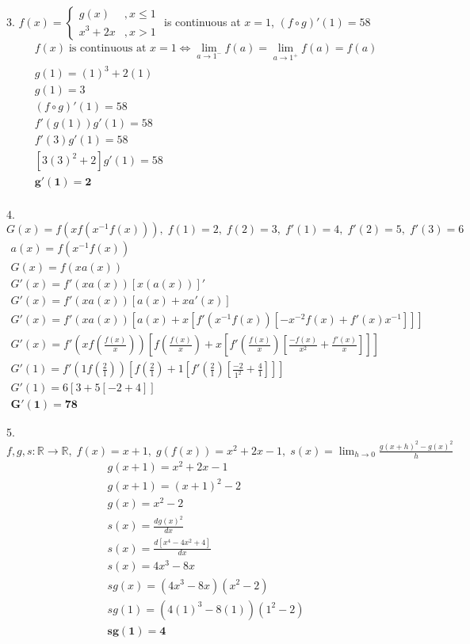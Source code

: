 \documentclass[12pt, letterpaper]{article}
\begin{document}
\newpage

3. \quad $ f(x) = \begin{cases}
    g(x) &,x \leq 1 \\
    x^3 + 2x &,x > 1
\end{cases}$ \; is continuous at $x=1$, $ (f \circ g)'(1) = 58 $
\begin{gather*}
    f(x) \; \text{is continuous at $x = 1$} \iff \lim_{a \to 1^-}f(a) = \lim_{a \to 1^+}f(a) = f(a)  \\
    g(1) = (1)^3 + 2(1) \\
    g(1) = 3 \\[8mm]
    (f \circ g)'(1) = 58 \\
    f'(g(1))g'(1) = 58 \\
    f'(3)g'(1) = 58 \\
    [3(3)^2 + 2]g'(1) = 58 \\
    \bm{g'(1) = 2} \\
\end{gather*}

4. \quad $ G(x) = f(xf(x^{-1}f(x))), \; f(1) = 2, \; f(2) = 3, \; f'(1) = 4, \; f'(2) = 5, \; f'(3) = 6$
\begin{gather*}
    a(x) = f(x^{-1}f(x)) \\
    G(x) = f(xa(x)) \\[8mm]
    G'(x) = f'(xa(x))[x(a(x))]' \\
    G'(x) = f'(xa(x))[a(x) + xa'(x)] \\
    G'(x) = f'(xa(x))[a(x) + x[f'(x^{-1}f(x))[-x^{-2}f(x) + f'(x)x^{-1}]]] \\
    G'(x) = f'(xf(\frac{f(x)}{x}))\left[ f(\frac{f(x)}{x}) +
    x\left[ f'(\frac{f(x)}{x})\left[ \frac{-f(x)}{x^2} + \frac{f'(x)}{x}\right] \right] \right] \\[8mm]
    G'(1) = f'(1f(\frac{2}{1}))\left[ f(\frac{2}{1}) +
    1\left[ f'(\frac{2}{1})\left[ \frac{-2}{1^2} + \frac{4}{1}\right] \right] \right] \\
    G'(1) = 6[3 + 5[-2 + 4]] \\
    \bm{G'(1) = 78}
\end{gather*}

5. \quad $ f, g, s : \mathbb{R} \to \mathbb{R}, \; f(x) = x + 1, \; g(f(x)) = x^2 + 2x - 1, \;
s(x) = \lim_{h\to0}\frac{g(x+h)^2 - g(x)^2}{h} $
\begin{gather*}
    g(x+1) = x^2 + 2x - 1 \\
    g(x+1) = (x + 1)^2 - 2 \\
    g(x) = x^2 - 2 \\[8mm]
    s(x) = \frac{dg(x)^2}{dx} \\
    s(x) = \frac{d[x^4 - 4x^2 + 4]}{dx} \\
    s(x) = 4x^3 - 8x \\[8mm]
    sg(x) = (4x^3 - 8x)(x^2 - 2) \\
    sg(1) = (4(1)^3 - 8(1))(1^2 - 2) \\
    \bm{sg(1) = 4}
\end{gather*}
\end{document}

